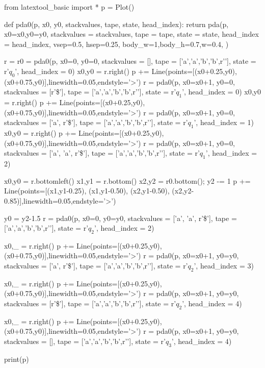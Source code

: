 \begin{python}
from latextool_basic import *
p = Plot()

def pda0(p, x0, y0, stackvalues, tape, state, head_index):
    return pda(p,
           x0=x0,y0=y0,
           stackvalues = stackvalues,
           tape = tape,
           state = state,
           head_index = head_index,
           vsep=0.5, hsep=0.25,
           body_w=1,body_h=0.7,w=0.4,
           )

r = r0 = pda0(p, x0=0, y0=0,
         stackvalues = [], tape = ['a','a','b','b',r'\SPACE'],
         state = r'$q_0$', head_index = 0)
x0,y0 = r.right()
p += Line(points=[(x0+0.25,y0),(x0+0.75,y0)],linewidth=0.05,endstyle='>')
r = pda0(p, x0=x0+1, y0=0,
        stackvalues = [r'\$'], tape = ['a','a','b','b',r'\SPACE'],
        state = r'$q_1$', head_index = 0)
x0,y0 = r.right()
p += Line(points=[(x0+0.25,y0),(x0+0.75,y0)],linewidth=0.05,endstyle='>')
r = pda0(p, x0=x0+1, y0=0,
    stackvalues = ['a', r'\$'], tape = ['a','a','b','b',r'\SPACE'],
    state = r'$q_1$', head_index = 1)
x0,y0 = r.right()
p += Line(points=[(x0+0.25,y0),(x0+0.75,y0)],linewidth=0.05,endstyle='>')
r = pda0(p, x0=x0+1, y0=0,
    stackvalues = ['a', 'a', r'\$'], tape = ['a','a','b','b',r'\SPACE'],
    state = r'$q_1$', head_index = 2)

x0,y0 = r.bottomleft()
x1,y1 = r.bottom()
x2,y2 = r0.bottom(); y2 -= 1
p += Line(points=[(x1,y1-0.25),
                  (x1,y1-0.50),
                  (x2,y1-0.50),
                  (x2,y2-0.85)],linewidth=0.05,endstyle='>')

y0 = y2-1.5
r = pda0(p, x0=0, y0=y0,
    stackvalues = ['a', 'a', r'\$'], tape = ['a','a','b','b',r'\SPACE'],
    state = r'$q_2$', head_index = 2)

x0,_ = r.right()
p += Line(points=[(x0+0.25,y0),(x0+0.75,y0)],linewidth=0.05,endstyle='>')
r = pda0(p, x0=x0+1, y0=y0,
    stackvalues = ['a', r'\$'], tape = ['a','a','b','b',r'\SPACE'],
    state = r'$q_2$', head_index = 3)

x0,_ = r.right()
p += Line(points=[(x0+0.25,y0),(x0+0.75,y0)],linewidth=0.05,endstyle='>')
r = pda0(p, x0=x0+1, y0=y0,
    stackvalues = [r'\$'], tape = ['a','a','b','b',r'\SPACE'],
    state = r'$q_2$', head_index = 4)

x0,_ = r.right()
p += Line(points=[(x0+0.25,y0),(x0+0.75,y0)],linewidth=0.05,endstyle='>')
r = pda0(p, x0=x0+1, y0=y0,
    stackvalues = [], tape = ['a','a','b','b',r'\SPACE'],
    state = r'$q_3$', head_index = 4)


print(p)
\end{python}

